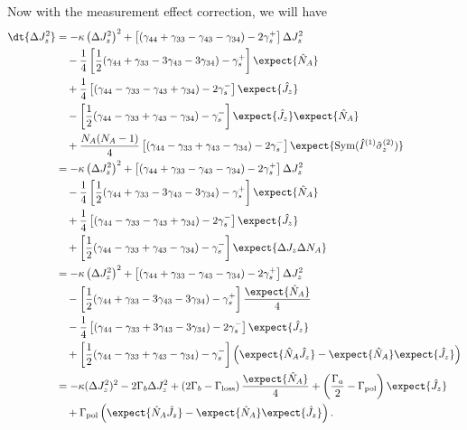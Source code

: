 \documentclass[]{report}
\begin{document}
Now with the measurement effect correction, we will have 
\begin{align}
\dt{\Delta J_z^2} &= -\kappa \left(\Delta J_z^2 \right)^2 +\left[(\gamma_{44}+\gamma_{33}-\gamma_{43}-\gamma_{34} ) -2\gamma_s^+\right] \Delta J_z^2\nonumber\\
&\quad -\frac{1}{4}\left[\frac{1}{2}(\gamma_{44}+\gamma_{33}-3\gamma_{43}-3\gamma_{34} ) -\gamma_s^+\right] \expect{\hat{N}_A }\nonumber\\
&\quad +\frac{1}{4}\left[(\gamma_{44}-\gamma_{33}-\gamma_{43}+\gamma_{34} ) -2\gamma_s^-\right] \expect{\hat{J}_z }\nonumber\\
&\quad -\left[\frac{1}{2}(\gamma_{44}-\gamma_{33}+\gamma_{43}-\gamma_{34} ) -\gamma_s^-\right] \expect{\hat{J}_z }\expect{\hat{N}_A}\nonumber\\
&\quad +\frac{N_A(N_A-1)}{4} \left[ (\gamma_{44}-\gamma_{33}+\gamma_{43}-\gamma_{34})  -2\gamma_s^-\right]\expect{\mathrm{Sym}(\hat{I}^{(1)}\hat{\sigma}_z^{(2)} ) }\\
&= -\kappa \left(\Delta J_z^2 \right)^2 +\left[(\gamma_{44}+\gamma_{33}-\gamma_{43}-\gamma_{34} ) -2\gamma_s^+\right] \Delta J_z^2\nonumber\\
&\quad -\frac{1}{4}\left[\frac{1}{2}(\gamma_{44}+\gamma_{33}-3\gamma_{43}-3\gamma_{34} ) -\gamma_s^+\right] \expect{\hat{N}_A }\nonumber\\
&\quad +\frac{1}{4}\left[(\gamma_{44}-\gamma_{33}-\gamma_{43}+\gamma_{34} ) -2\gamma_s^-\right] \expect{\hat{J}_z }\nonumber\\
&\quad +\left[\frac{1}{2}(\gamma_{44}-\gamma_{33}+\gamma_{43}-\gamma_{34} ) -\gamma_s^-\right] \expect{\Delta J_z \Delta N_A}\\
&=-\kappa \left(\Delta J_z^2 \right)^2 +\left[(\gamma_{44}+\gamma_{33}-\gamma_{43}-\gamma_{34} ) -2\gamma_s^+\right] \Delta J_z^2\nonumber\\
&\quad -\left[\frac{1}{2}(\gamma_{44}+\gamma_{33}-3\gamma_{43}-3\gamma_{34} ) -\gamma_s^+\right] \frac{\expect{\hat{N}_A }}{4}\nonumber\\
&\quad -\frac{1}{4}\left[(\gamma_{44}-\gamma_{33}+3\gamma_{43}-3\gamma_{34} ) -2\gamma_s^-\right] \expect{\hat{J}_z }\nonumber\\
&\quad +\left[\frac{1}{2}(\gamma_{44}-\gamma_{33}+\gamma_{43}-\gamma_{34} ) -\gamma_s^-\right] \left(\expect{\hat{N}_A \hat{J}_z}-\expect{\hat{N}_A}\expect{\hat{J}_z}\right)\\
&= -\kappa(\Delta J_z^2)^2 -2\Gamma_b\Delta J_z^2 + \left(2\Gamma_b-\Gamma_{\rm loss}\right)\frac{\expect{\hat{N}_A}}{4} +\left(\frac{\Gamma_a}{2}-\Gamma_{\rm pol} \right)\expect{\hat{J}_z}\nonumber\\
&\quad +\Gamma_{\rm pol}\left( \expect{\hat{N}_A\hat{J}_z}-\expect{\hat{N}_A}\expect{\hat{J}_z} \right) .
\end{align}
\end{document}
